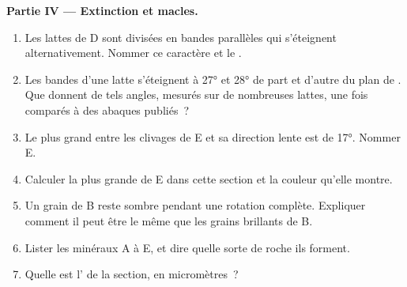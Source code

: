 \begin{problem}
\medskip
\noindent\textbf{Partie IV --- Extinction et macles.}
\begin{enumerate}[resume]
  \item Les lattes de D sont divisées en bandes parallèles qui s'éteignent
        alternativement. Nommer ce caractère et le .
  \item Les bandes d'une latte s'éteignent à \ang{27} et \ang{28} de part et
        d'autre du plan de . Que donnent de tels angles, mesurés sur de
        nombreuses lattes, une fois comparés à des abaques publiés~?
  \item Le plus grand  entre les clivages de E et sa direction
        lente est de \ang{17}. Nommer E.
  \item Calculer la plus grande  de E dans cette section et la
        couleur qu'elle montre.
  \item Un grain de B reste sombre pendant une rotation complète. Expliquer
        comment il peut être le même  que les grains brillants de B.
  \item Lister les minéraux A à E, et dire quelle sorte de roche ils forment.
  \item Quelle est l' de la section, en micromètres~?
\end{enumerate}
\end{problem}

